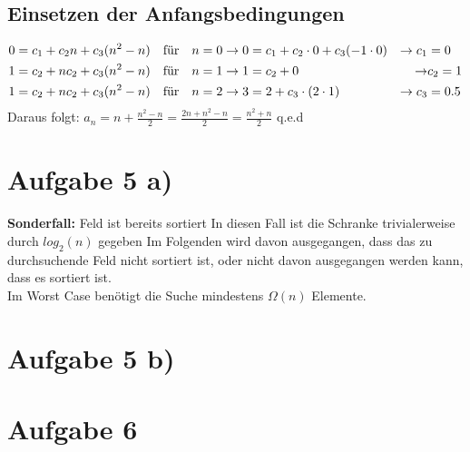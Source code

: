\documentclass[a4paper,10pt,freqn]{article}
\begin{document}
\subsection{Einsetzen der Anfangsbedingungen}
\begin{align*}
 0&=c_1+c_2n+c_3(n^2-n) &\text{für\quad}& n = 0\rightarrow 0 = c_1+c_2\cdot0+c_3(-1\cdot0) &\rightarrow c_1& = 0\\
 1&=c_2+nc_2+c_3(n^2-n) &\text{für\quad}& n = 1\rightarrow 1 = c_2+0 &\rightarrow& c_2 = 1\\
 1&=c_2+nc_2+c_3(n^2-n) &\text{für\quad}& n = 2\rightarrow 3 = 2+c_3\cdot(2\cdot1) &\rightarrow c_3& = 0.5\\
\end{align*}
Daraus folgt: $a_n = n+\frac{n^2-n}{2}=\frac{2n+n^2-n}{2}=\frac{n^2+n}{2}$ q.e.d

\section{Aufgabe 5 a)}
\textbf{Sonderfall:} Feld ist bereits sortiert \textrightarrow In diesen Fall ist die Schranke trivialerweise durch $log_2(n)$ gegeben
\newline
Im Folgenden wird davon ausgegangen, dass das zu durchsuchende Feld nicht sortiert ist, oder nicht davon ausgegangen werden kann, dass es sortiert ist.\\
Im Worst Case benötigt die Suche mindestens $\Omega(n)$ Elemente.

\section{Aufgabe 5 b)}

\section{Aufgabe 6}
\end{document}
